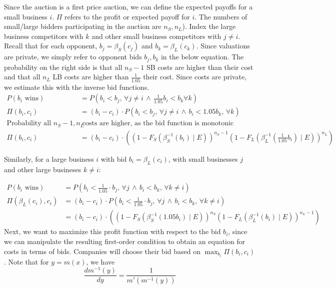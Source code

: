 Since the auction is a first price auction, we can define the expected payoffs
for a small business \(i\).
\( \Pi \) refers to the profit or expected payoff for \(i\).
The numbers of small/large bidders participating in the auction are
\(n_S, n_L\)). Index the  large business competitors with \(k\) and
other small business competitors with \(j \ne i\).
Recall that for each opponent, \( b_{j} = \beta_{S}(c_{j}) \) and
\( b_{k} = \beta_{L}(c_{k}) \). 
Since valuations are private, we simply refer to opponent bids \( b_j, b_k \)
in the below equation.
The probability on the right side is that all \(n_S - 1\) SB costs are higher
than their cost and that all \( n_L \) LB costs are higher than \( \frac{1}{1.05} \) their cost.
Since costs are private, we estimate this with the inverse bid functions.
\[
  \begin{aligned}
    P(b_i \text{ wins}) &= P \left(
    b_i< b_j, \, \forall j \ne i 
   \, \land \, \frac{1}{1.05} b_i < b_k \forall k \right) \\
  \Pi(b_i, c_i) &= (b_i - c_i) \cdot
    P \left(b_i < b_j, \, \forall j \neq i \, \land \,
    b_i < 1.05 b_k, \, \forall k \right) \\
    \text{Probability all } n_S - 1, n_L & \text{ costs are higher, as the
    bid function is monotonic} \\
  \Pi(b_i, c_i) &= (b_i - c_i) \cdot \left(
    \left( 1 - F_S(\beta_{S}^{-1}(b_i) \mid E) \right)^{n_S - 1}
    \left( 1 - F_L(\beta_{L}^{-1}(\frac{1}{1.05}b_i) \mid E) \right)^{n_L} \right)
  \end{aligned}
\]

Similarly, for a large business \(i\) with bid \(b_i = \beta_L(c_i)\), with
small businesses \(j\) and other large busineses \(k \ne i\):

\[
  \begin{aligned}
    P(b_i \text{ wins}) &=
    P \left( b_i < \frac{1}{1.05} \cdot b_j, \, \forall j \, \land \,
    b_i< b_k, \, \forall k \ne i \right) \\
  \Pi(\beta_L (c_i), c_i) &= (b_i - c_i) \cdot
    P \left( b_i < \frac{1}{1.05} \cdot b_j, \, \forall j \, \land \,
    b_i< b_k, \, \forall k \ne i \right) \\
  &= (b_i - c_i) \cdot \left(
    \left( 1 - F_S(\beta_{S}^{-1}(1.05 b_i) \mid E) \right)^{n_S}
    \left( 1 - F_L(\beta_{L}^{-1}(b_i) \mid E) \right)^{n_L - 1} \right)
  \end{aligned}
\]
Next, we want to maximize this profit function with respect to the bid \(b_i\),
since we can manipulate the resulting first-order condition to obtain an equation
for costs in terms of bids.
Companies will choose their bid based on
\( \max_{b_i} \Pi(b_i, c_i) \).
Note that for \( y = m(x) \), we have
\[ \frac{d m^{-1}(y)}{dy} = \frac{1}{m'(m^{-1}(y))} \]

